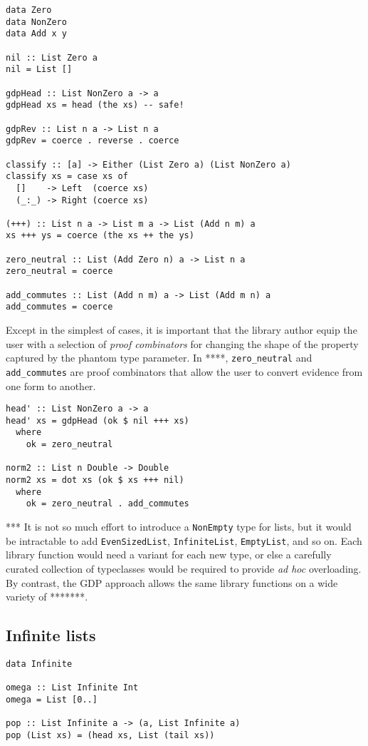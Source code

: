 \documentclass[format=sigplan, review=false, screen=true]{acmart}
\begin{document}
\begin{verbatim}
data Zero
data NonZero
data Add x y

nil :: List Zero a
nil = List []

gdpHead :: List NonZero a -> a
gdpHead xs = head (the xs) -- safe!

gdpRev :: List n a -> List n a
gdpRev = coerce . reverse . coerce

classify :: [a] -> Either (List Zero a) (List NonZero a)
classify xs = case xs of
  []    -> Left  (coerce xs)
  (_:_) -> Right (coerce xs)
  
(+++) :: List n a -> List m a -> List (Add n m) a
xs +++ ys = coerce (the xs ++ the ys)

zero_neutral :: List (Add Zero n) a -> List n a
zero_neutral = coerce

add_commutes :: List (Add n m) a -> List (Add m n) a
add_commutes = coerce
\end{verbatim}

Except in the simplest of cases, it is important that the library author equip the
user with a selection of \emph{proof combinators} for changing the shape of the
property captured by the phantom type parameter. In ****, \texttt{zero\_neutral}
and \texttt{add\_commutes} are proof combinators that allow the user to convert
evidence from one form to another.

\begin{verbatim}
head' :: List NonZero a -> a
head' xs = gdpHead (ok $ nil +++ xs)
  where
    ok = zero_neutral

norm2 :: List n Double -> Double
norm2 xs = dot xs (ok $ xs +++ nil)
  where
    ok = zero_neutral . add_commutes
\end{verbatim}

*** It is not so much effort to introduce a \texttt{NonEmpty} type for lists, but it
would be intractable to add \texttt{EvenSizedList}, \texttt{InfiniteList},
\texttt{EmptyList}, and so on. Each library function would need a variant
for each new type, or else a carefully curated collection of typeclasses would
be required to provide \emph{ad hoc} overloading. By contrast, the GDP approach
allows the same library functions on a wide variety of *******.

\subsection{Infinite lists}

\begin{verbatim}
data Infinite

omega :: List Infinite Int
omega = List [0..]

pop :: List Infinite a -> (a, List Infinite a)
pop (List xs) = (head xs, List (tail xs))
\end{verbatim}
\end{document}
